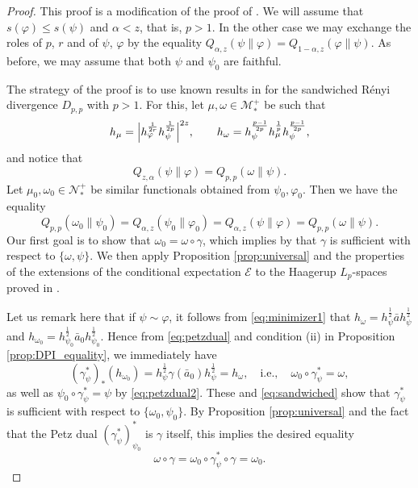 \documentclass[12pt]{article}
\theoremstyle{definition}
\theoremstyle{remark}
\numberwithin{equation}{section}
\def\cE{\mathcal E}
\def\Me{\mathcal M}
\def\Ne{\mathcal N}
\def\ffi{\varphi}
\begin{document}
\begin{proof} This proof is a modification of the proof of \cite[Theorem
5.1]{jencova2021renyi}.  
We will assume that $s(\ffi)\le s(\psi)$ and $\alpha<z$, that is, $p>1$. In the other case we may
exchange the roles of $p$, $r$ and of $\psi$, $\ffi$ by the equality
$Q_{\alpha,z}(\psi\|\varphi)=Q_{1-\alpha,z}(\varphi\|\psi)$. As before, we may assume that
both $\psi$ and $\psi_0$ are faithful.

The strategy of the proof is to use known results in \cite{jencova2018renyi} for the sandwiched
R\'enyi divergence $D_{p,p}$ with $p>1$. For this, {let $\mu,\omega\in\Me_*^+$ be such that
\[
h_{\mu}=\Big|h_{\ffi}^{1\over 2r}h_{\psi}^{1\over 2p}\Big|^{2z},\qquad
h_\omega=h_\psi^{p-1\over 2p}h_\mu^{\frac1p}h_\psi^{p-1\over 2p},
\]}
and notice that
\[
Q_{z,\alpha}(\psi\|\ffi)=Q_{p,p}(\omega\|\psi).
\]
Let $\mu_0,\omega_0\in \Ne_*^+$ be similar functionals obtained from $\psi_0,\ffi_0$. Then
we have the equality
\begin{equation}\label{eq:sandwiched}
Q_{p,p}(\omega_0\|\psi_0)=Q_{\alpha,z}(\psi_0\|\ffi_0)=Q_{\alpha,z}(\psi\|\ffi)=Q_{p,p}(\omega\|\psi).
\end{equation}
Our first goal is to show that $\omega_0=\omega\circ\gamma$, which implies by
\cite[Theorem 4.6]{jencova2018renyi} that $\gamma$ is sufficient with respect to $\{\omega,\psi\}$. 
We then apply Proposition \ref{prop:universal} and the properties of the extensions of the
conditional expectation $\cE$ to the Haagerup $L_p$-spaces proved in
\cite{junge2003noncommutative}. 

Let us remark here that if $\psi\sim \ffi$, {it follows from \eqref{eq:minimizer1} that}
$h_\omega=h_\psi^{\frac12}\bar ah_\psi^{\frac12}$ and
$h_{\omega_0}=h_{\psi_0}^{\frac12}\bar a_0h_{\psi_0}^{\frac12}$. Hence from {\eqref{eq:petzdual}
and condition (ii)} in Proposition \ref{prop:DPI_equality}, we immediately have
\[
(\gamma^*_{\psi})_*(h_{\omega_0})=h_\psi^{\frac12}\gamma(\bar
a_0)h_\psi^{\frac12}=h_\omega,\quad
{\mbox{i.e.},\quad\omega_0\circ\gamma_\psi^*=\omega,}
\]
{as well as $\psi_0\circ\gamma_\psi^*=\psi$ by \eqref{eq:petzdual2}.}
These and \eqref{eq:sandwiched} {show} that $\gamma^*_\psi$ is sufficient with respect to
$\{\omega_0,\psi_0\}$. By Proposition \ref{prop:universal} and the fact that the
Petz dual  $(\gamma_\psi^*)_{\psi_0}^*$ is $\gamma$ itself, this implies the desired
equality
\[
\omega\circ\gamma= \omega_0\circ \gamma_\psi^*\circ\gamma=\omega_0.
\]


\end{proof}
\end{document}
